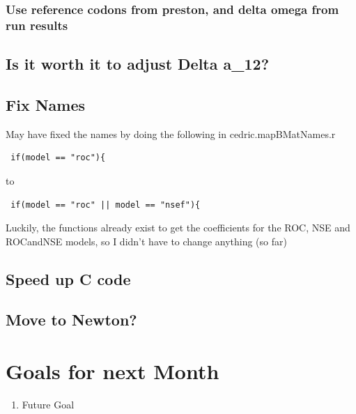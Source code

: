 \subsubsection{Use reference codons from preston, and delta omega from run results}

\subsection{Is it worth it to adjust Delta a\_12?}

\subsection{Fix Names}

May have fixed the names by doing the following in cedric.mapBMatNames.r

\begin{verbatim}
 if(model == "roc"){
\end{verbatim}

to

\begin{verbatim}
 if(model == "roc" || model == "nsef"){
\end{verbatim}

Luckily, the functions already exist to get the coefficients for the ROC, NSE and ROCandNSE models, so I didn't have to change anything (so far)

\subsection{Speed up C code}

\subsection{Move to Newton?}




\section{Goals for next Month}
\begin{enumerate}
\item Future Goal
\end{enumerate}


